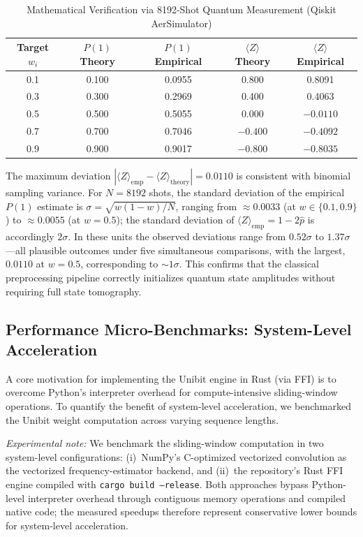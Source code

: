 ﻿\documentclass[12pt,a4paper]{article}
\begin{document}
\begin{table}[H]
\centering
\caption{Mathematical Verification via 8192-Shot Quantum Measurement (Qiskit AerSimulator)}
\label{tab:math_verify}
\small
\begin{tabular}{@{}ccccc@{}}
\toprule
\textbf{Target $w_i$} & \textbf{$P(1)$ Theory} & \textbf{$P(1)$ Empirical} & \textbf{$\langle Z \rangle$ Theory} & \textbf{$\langle Z \rangle$ Empirical} \\
\midrule
0.1 & 0.100 & 0.0955 & 0.800 & 0.8091 \\
0.3 & 0.300 & 0.2969 & 0.400 & 0.4063 \\
0.5 & 0.500 & 0.5055 & 0.000 & $-0.0110$ \\
0.7 & 0.700 & 0.7046 & $-0.400$ & $-0.4092$ \\
0.9 & 0.900 & 0.9017 & $-0.800$ & $-0.8035$ \\
\bottomrule
\end{tabular}
\end{table}

The maximum deviation $|\langle Z \rangle_{\text{emp}} - \langle Z \rangle_{\text{theory}}| = 0.0110$ is consistent with binomial sampling variance. For $N = 8192$ shots, the standard deviation of the empirical $P(1)$ estimate is $\sigma = \sqrt{w(1-w)/N}$, ranging from $\approx 0.0033$ (at $w \in \{0.1, 0.9\}$) to $\approx 0.0055$ (at $w = 0.5$); the standard deviation of $\langle Z \rangle_{\text{emp}} = 1 - 2\hat{p}$ is accordingly $2\sigma$. In these units the observed deviations range from $0.52\sigma$ to $1.37\sigma$---all plausible outcomes under five simultaneous comparisons, with the largest, $0.0110$ at $w = 0.5$, corresponding to $\sim 1\sigma$. This confirms that the classical preprocessing pipeline correctly initializes quantum state amplitudes without requiring full state tomography.

\subsection{Performance Micro-Benchmarks: System-Level Acceleration}

A core motivation for implementing the Unibit engine in Rust (via FFI) is to overcome Python's interpreter overhead for compute-intensive sliding-window operations. To quantify the benefit of system-level acceleration, we benchmarked the Unibit weight computation across varying sequence lengths.

\textit{Experimental note:} We benchmark the sliding-window computation in two system-level configurations: (i)~NumPy's C-optimized vectorized convolution as the vectorized frequency-estimator backend, and (ii)~the repository's Rust FFI engine compiled with \texttt{cargo build --release}. Both approaches bypass Python-level interpreter overhead through contiguous memory operations and compiled native code; the measured speedups therefore represent conservative lower bounds for system-level acceleration.
\end{document}
